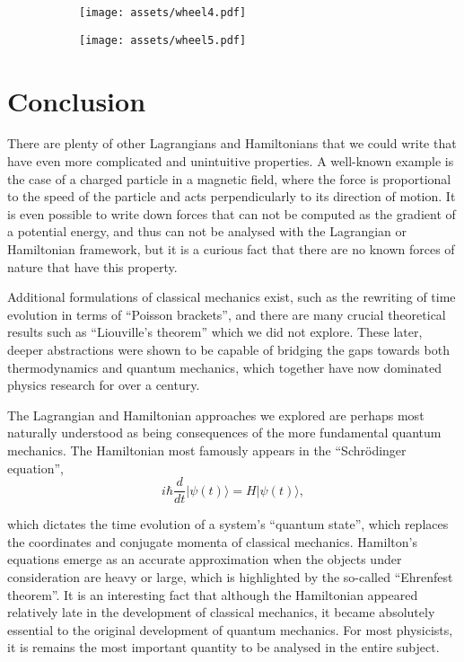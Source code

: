 \documentclass[11pt]{article}
\begin{document}
\begin{figure}[htbp]
\centering
\begin{subfigure}{130pt}
\texttt{[image: assets/wheel4.pdf]}
\end{subfigure}
\begin{subfigure}{130pt}
\texttt{[image: assets/wheel5.pdf]}
\end{subfigure}
\label{plot:whee4}
\end{figure}

\section{Conclusion}

There are plenty of other Lagrangians and Hamiltonians that we could write that have even more complicated and unintuitive properties. A well\hyp{}known example is the case of a charged particle in a magnetic field, where the force is proportional to the speed of the particle and acts perpendicularly to its direction of motion. It is even possible to write down forces that can not be computed as the gradient of a potential energy, and thus can not be analysed with the Lagrangian or Hamiltonian framework, but it is a curious fact that there are no known forces of nature that have this property.
\newpage

Additional formulations of classical mechanics exist, such as the rewriting of time evolution in terms of ``Poisson brackets'', and there are many crucial theoretical results such as ``Liouville's theorem'' which we did not explore. These later, deeper abstractions were shown to be capable of bridging the gaps towards both thermodynamics and quantum mechanics, which together have now dominated physics research for over a century.
\newline

The Lagrangian and Hamiltonian approaches we explored are perhaps most naturally understood as being consequences of the more fundamental quantum mechanics. The Hamiltonian most famously appears in the ``Schr\"odinger equation'',
$$i\hbar\frac{d}{dt}\vert\psi(t)\rangle=H\vert\psi(t)\rangle,$$

which dictates the time evolution of a system's ``quantum state'', which replaces the coordinates and conjugate momenta of classical mechanics. Hamilton's equations emerge as an accurate approximation when the objects under consideration are heavy or large, which is highlighted by the so\hyp{}called ``Ehrenfest theorem''. It is an interesting fact that although the Hamiltonian appeared relatively late in the development of classical mechanics, it became absolutely essential to the original development of quantum mechanics. For most physicists, it is remains the most important quantity to be analysed in the entire subject.
\newline
\end{document}
